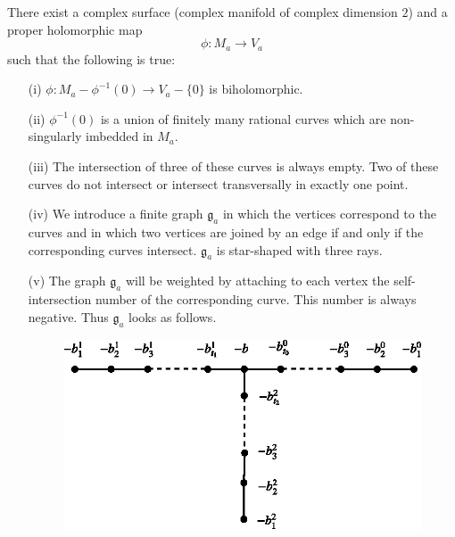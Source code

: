 \begin{theorem*}
There exist a complex surface (complex manifold of complex dimension $2$) and a proper holomorphic map
$$
\phi : M_{a}\to V_{a}
$$
such that the following is true:
\begin{itemize}
\item[\rm(i)] $\phi : M_{a}-\phi^{-1}(0)\to V_{a}-\{0\}$ is biholomorphic.

\item[\rm(ii)] $\phi^{-1}(0)$ is a union of finitely many rational curves which are non-singularly imbedded in $M_{a}$.

\item[\rm(iii)] The intersection of three of these curves is always empty. Two of these curves do not intersect or intersect transversally in exactly one point.

\item[\rm(iv)] We introduce a finite graph $\mathfrak{g}_{a}$ in which the vertices correspond to the curves and in which two vertices are joined by an edge if and only if the corresponding curves intersect. $\mathfrak{g}_{a}$ is star-shaped with three rays.

\item[\rm(v)] The graph $\mathfrak{g}_{a}$ will be weighted by attaching to each vertex the self-intersection number of the corresponding curve. This number is always negative. Thus $\mathfrak{g}_{a}$ looks as follows.
\begin{figure}[H]
\centering
\includegraphics{src/chap11/fig9.eps}
\end{figure}


\end{itemize}
\end{theorem*}
